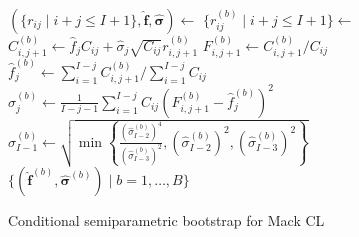 \documentclass[a4paper]{book}
\begin{document}
\begin{figure}[p]
  \begin{algorithm}[H]
    \caption{Conditional semiparametric bootstrap for Mack CL} 
    \label{alg:cond-semiparam-mack}
    \begin{algorithmic} 
      \vspace{3pt}
      \State $(\{ r_{ij} \mid i + j \leq I + 1 \}, \bm{\widehat{f}}, \bm{\widehat{\sigma}}) \gets$  
      \vspace{3pt}
        \vspace{3pt}
        \State $\{ r^{(b)}_{ij} \mid i + j \leq I + 1 \} \gets$ 
        \vspace{3pt}
            \vspace{3pt}
            \State $C^{(b)}_{i, j + 1} \gets \widehat{f}_j C_{ij} + \widehat{\sigma}_j \sqrt{C_{ij}} r^{(b)}_{i, j + 1}$
            \vspace{3pt}
            \State $\displaystyle F^{(b)}_{i, j + 1} \gets C^{(b)}_{i, j + 1} / C_{ij}$
            \vspace{3pt}
          \EndFor
          \vspace{3pt}
          \State $\widehat{f}^{(b)}_j \gets \sum_{i = 1}^{I - j} C^{(b)}_{i, j + 1} / \sum_{i = 1}^{I - j} C_{ij}$
          \vspace{3pt}
            \vspace{3pt}
            \State $\displaystyle \widehat{\sigma}^{(b)}_j \gets \frac{1}{I - j - 1}\sum_{i = 1}^{I - j} C_{ij} \left( F^{(b)}_{i, j + 1} - \widehat{f}^{(b)}_j \right)^2$
            \vspace{3pt}
          \Else
            \vspace{3pt}
            \State $\widehat{\sigma}^{(b)}_{I - 1} \gets \sqrt{\min{ \left \{ \displaystyle \frac{(\widehat{\sigma}^{(b)}_{I - 2})^4}{(\widehat{\sigma}^{(b)}_{I - 3})^2}, (\widehat{\sigma}^{(b)}_{I - 2})^2, (\widehat{\sigma}^{(b)}_{I - 3})^2 \right \} }}$
            \vspace{3pt}
            \EndIf
          \EndFor
      \EndFor
      \State \Return $\{ (\widehat{\bm{f}}^{(b)}, \widehat{\bm{\sigma}}^{(b)}) \mid b = 1, \dots, B \}$
    \end{algorithmic}
  \end{algorithm}

\end{figure}
\end{document}
